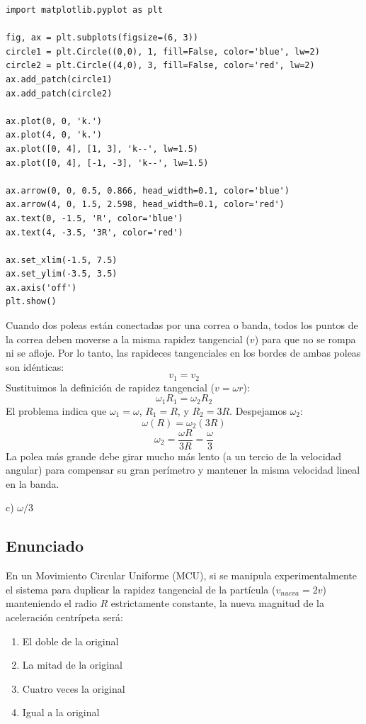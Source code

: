\documentclass[12pt, a4paper]{article}
\begin{document}
\begin{verbatim}
import matplotlib.pyplot as plt

fig, ax = plt.subplots(figsize=(6, 3))
circle1 = plt.Circle((0,0), 1, fill=False, color='blue', lw=2)
circle2 = plt.Circle((4,0), 3, fill=False, color='red', lw=2)
ax.add_patch(circle1)
ax.add_patch(circle2)

ax.plot(0, 0, 'k.')
ax.plot(4, 0, 'k.')
ax.plot([0, 4], [1, 3], 'k--', lw=1.5)
ax.plot([0, 4], [-1, -3], 'k--', lw=1.5)

ax.arrow(0, 0, 0.5, 0.866, head_width=0.1, color='blue')
ax.arrow(4, 0, 1.5, 2.598, head_width=0.1, color='red')
ax.text(0, -1.5, 'R', color='blue')
ax.text(4, -3.5, '3R', color='red')

ax.set_xlim(-1.5, 7.5)
ax.set_ylim(-3.5, 3.5)
ax.axis('off')
plt.show()
\end{verbatim}

Cuando dos poleas están conectadas por una correa o banda, todos los puntos de la correa deben moverse a la misma rapidez tangencial ($v$) para que no se rompa ni se afloje. Por lo tanto, las rapideces tangenciales en los bordes de ambas poleas son idénticas:
$$ v_1 = v_2 $$
Sustituimos la definición de rapidez tangencial ($v = \omega r$):
$$ \omega_1 R_1 = \omega_2 R_2 $$
El problema indica que $\omega_1 = \omega$, $R_1 = R$, y $R_2 = 3R$. Despejamos $\omega_2$:
$$ \omega (R) = \omega_2 (3R) $$
$$ \omega_2 = \frac{\omega R}{3R} = \frac{\omega}{3} $$
La polea más grande debe girar mucho más lento (a un tercio de la velocidad angular) para compensar su gran perímetro y mantener la misma velocidad lineal en la banda.

\begin{tcolorbox}[colback=green!5!white, colframe=green!50!black, title=Respuesta Final]
\centering \Large c) $\omega / 3$
\end{tcolorbox}

\newpage

\subsection*{Enunciado}
En un Movimiento Circular Uniforme (MCU), si se manipula experimentalmente el sistema para duplicar la rapidez tangencial de la partícula ($v_{nueva} = 2v$) manteniendo el radio $R$ estrictamente constante, la nueva magnitud de la aceleración centrípeta será:
\begin{enumerate}[label=\alph*)]
    \item El doble de la original
    \item La mitad de la original
    \item Cuatro veces la original
    \item Igual a la original
\end{enumerate}
\end{document}
